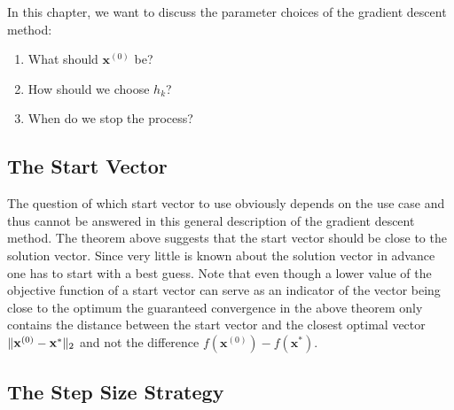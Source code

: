 In this chapter, we want to discuss the parameter choices of the gradient descent method:
\begin{enumerate}
 \item What should \(\mathbf{x}^{(0)}\) be?
 \item How should we choose \(h_k\)?
 \item When do we stop the process?
\end{enumerate}



\subsection{The Start Vector} \label{subsec:start_vector}

The question of which start vector to use obviously depends on the use case
and thus cannot be answered in this general description of the gradient descent method.
The theorem above suggests that the start vector should be close to the solution vector.
Since very little is known about the solution vector in advance
one has to start with a best guess.
Note that even though a lower value of the objective function of a start vector can serve as an indicator
of the vector being close to the optimum
the guaranteed convergence in the above theorem only contains the distance
between the start vector and the closest optimal vector \(\lVert\mathbf{x}^{(0)} - \mathbf{x}^*\rVert_2\)
and not the difference \(f(\mathbf{x}^{(0)}) - f(\mathbf{x}^*)\).



\subsection{The Step Size Strategy} \label{subsec:step_size_strategy}

